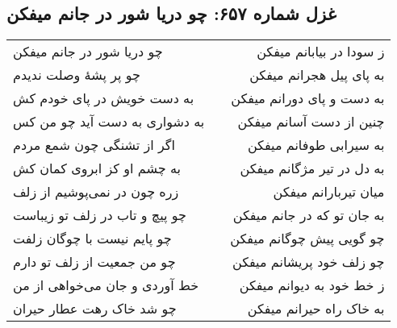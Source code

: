 \begin{center}
\section*{غزل شماره ۶۵۷: چو دریا شور در جانم میفکن}
\label{sec:657}
\begin{longtable}{l p{0.5cm} r}
چو دریا شور در جانم میفکن
&&
ز سودا در بیابانم میفکن
\\
چو پر پشهٔ وصلت ندیدم
&&
به پای پیل هجرانم میفکن
\\
به دست خویش در پای خودم کش
&&
به دست و پای دورانم میفکن
\\
به دشواری به دست آید چو من کس
&&
چنین از دست آسانم میفکن
\\
اگر از تشنگی چون شمع مردم
&&
به سیرابی طوفانم میفکن
\\
به چشم او کز ابروی کمان کش
&&
به دل در تیر مژگانم میفکن
\\
زره چون در نمی‌پوشیم از زلف
&&
میان تیربارانم میفکن
\\
چو پیچ و تاب در زلف تو زیباست
&&
به جان تو که در جانم میفکن
\\
چو پایم نیست با چوگان زلفت
&&
چو گویی پیش چوگانم میفکن
\\
چو من جمعیت از زلف تو دارم
&&
چو زلف خود پریشانم میفکن
\\
خط آوردی و جان می‌خواهی از من
&&
ز خط خود به دیوانم میفکن
\\
چو شد خاک رهت عطار حیران
&&
به خاک راه حیرانم میفکن
\\
\end{longtable}
\end{center}
